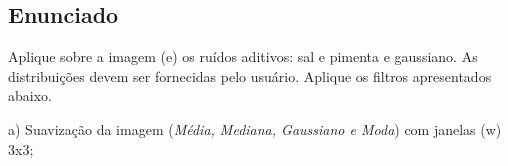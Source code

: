 \documentclass[10pt,a4paper]{article}
\begin{document}
\subsection{Enunciado}

\begin{flushleft}
Aplique sobre a imagem (e) os ruídos aditivos: sal e pimenta e gaussiano. As distribuições devem ser fornecidas pelo usuário. Aplique os filtros apresentados abaixo.
\end{flushleft}

\begin{figure}[H]
    \centering
    \qquad
    \qquad
    \qquad
    \qquad
\end{figure}

\begin{flushleft}
a) Suavização da imagem (\textit {Média, Mediana, Gaussiano e Moda}) com janelas (w) 3x3;
\end{flushleft}
\end{document}
